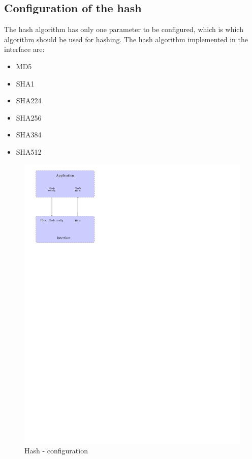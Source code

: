 \subsection*{Configuration of the hash}

The hash algorithm has only one parameter to be configured, which is which
algorithm should be used for hashing.
The hash algorithm implemented in the interface are:
\begin{itemize}[noitemsep]
  \item MD5
  \item SHA1
  \item SHA224
  \item SHA256
  \item SHA384
  \item SHA512
\end{itemize}

\begin{figure}[!ht]
\centering
\includegraphics[trim=0cm 20cm 9.5cm 0cm]{figures/hash_example_config.pdf}
\caption{Hash - configuration\newline}
\label{fig:gci_hash_config}
\end{figure}

